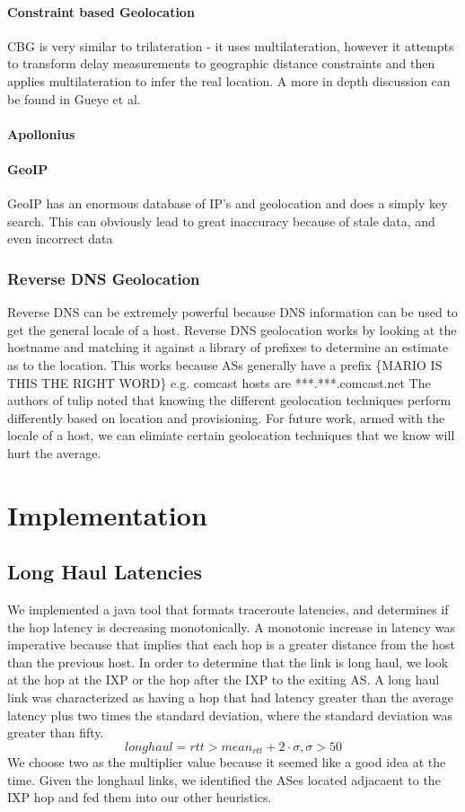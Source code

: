 \documentclass{acm_proc_article-sp}
\begin{document}
\paragraph{Constraint based Geolocation}
CBG is very similar to trilateration - it uses multilateration, however it attempts to transform delay measurements 
to geographic distance constraints and then applies multilateration to infer the real location. \cite{Gueye:2006}
A more in depth discussion can be found in Gueye et al. \cite{Gueye:2006}
\paragraph{Apollonius}
\paragraph{GeoIP}
GeoIP has an enormous database of IP's and geolocation and does a simply key search. This can obviously lead
to great inaccuracy because of stale data, and even incorrect data


\subsubsection{Reverse DNS Geolocation}
Reverse DNS can be extremely powerful because DNS information can be used to get the general locale of a host. \cite{Spring:2004}
Reverse DNS geolocation works by looking at the hostname and matching it against a library of prefixes to determine an estimate as to the 
location. This works because ASs generally have a prefix \{MARIO IS THIS THE RIGHT WORD\} e.g. comcast hosts are ***.***.comcast.net
The authors of tulip noted that knowing the different geolocation techniques perform differently based on location
and provisioning.\cite{TulipInfoComm} 
For future work, armed with the locale of a host, we can elimiate certain geolocation techniques that we know will hurt the average.



\section{Implementation}
\subsection{Long Haul Latencies}
We implemented a java tool that formats traceroute latencies, and determines if the hop latency is decreasing monotonically.
A monotonic increase in latency was imperative because that implies that each hop is a greater distance from the host than the previous host.
In order to determine that the link is long haul, we look at the hop at the IXP or the hop after the IXP to the exiting AS.
A long haul link was characterized as having a hop that had latency greater than the average latency plus two times the standard deviation, where the 
standard deviation was greater than fifty.
$$ longhaul = rtt > mean_{rtt} + 2\cdot \sigma, \sigma > 50$$
We choose two as the multiplier value because it seemed like a good idea at the time. Given the longhaul links, we identified the ASes located adjacaent to the IXP hop and fed them into our 
other heuristics.
\end{document}
